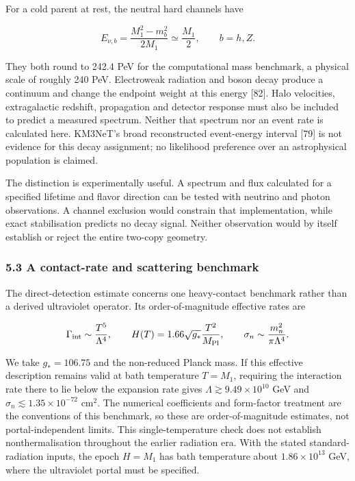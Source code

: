\documentclass[
]{article}
\begin{document}
For a cold parent at rest, the neutral hard channels have

\[
E_{\nu,b}=\frac{M_1^2-m_b^2}{2M_1}\simeq\frac{M_1}{2},\qquad b=h,Z.
\]

They both round to 242.4 PeV for the computational mass benchmark, a
physical scale of roughly 240 PeV. Electroweak radiation and boson decay
produce a continuum and change the endpoint weight at this energy
{[}82{]}. Halo velocities, extragalactic redshift, propagation and
detector response must also be included to predict a measured spectrum.
Neither that spectrum nor an event rate is calculated here. KM3NeT's
broad reconstructed event-energy interval {[}79{]} is not evidence for
this decay assignment; no likelihood preference over an astrophysical
population is claimed.

The distinction is experimentally useful. A spectrum and flux calculated
for a specified lifetime and flavor direction can be tested with
neutrino and photon observations. A channel exclusion would constrain
that implementation, while exact stabilisation predicts no decay signal.
Neither observation would by itself establish or reject the entire
two-copy geometry.

\subsubsection{5.3 A contact-rate and scattering
benchmark}\label{a-contact-rate-and-scattering-benchmark}

The direct-detection estimate concerns one heavy-contact benchmark
rather than a derived ultraviolet operator. Its order-of-magnitude
effective rates are

\[
\Gamma_{\rm int}\sim\frac{T^5}{\Lambda^4},\qquad
H(T)=1.66\sqrt{g_*}\frac{T^2}{M_{\rm Pl}},\qquad
\sigma_n\sim\frac{m_n^2}{\pi\Lambda^4}.
\]

We take \(g_*=106.75\) and the non-reduced Planck mass. If this
effective description remains valid at bath temperature \(T=M_1\),
requiring the interaction rate there to lie below the expansion rate
gives \(\Lambda\gtrsim9.49\times10^{10}\) GeV and
\(\sigma_n\lesssim1.35\times10^{-72}\) cm\(^2\). The numerical
coefficients and form-factor treatment are the conventions of this
benchmark, so these are order-of-magnitude estimates, not
portal-independent limits. This single-temperature check does not
establish nonthermalisation throughout the earlier radiation era. With
the stated standard-radiation inputs, the epoch \(H=M_1\) has bath
temperature about \(1.86\times10^{13}\) GeV, where the ultraviolet
portal must be specified.
\end{document}
